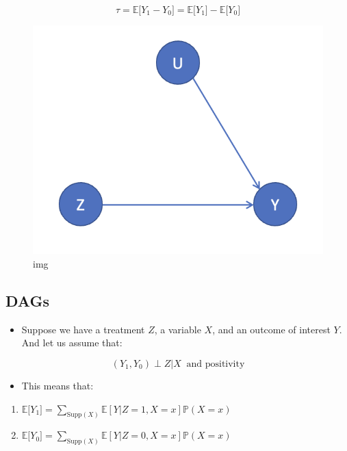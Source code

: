 \documentclass[11pt]{article}
\providecommand{\tightlist}{%
      \setlength{\itemsep}{0pt}\setlength{\parskip}{0pt}}
\begin{document}
\[ \tau = \mathbb{E}\big[Y_{1} - Y_{0}\big] =  \mathbb{E}\big[Y_{1}\big] -  \mathbb{E}\big[Y_{0}\big] \]

\begin{figure}
\centering
\includegraphics{../img/dag4.png}
\caption{img}
\end{figure}

    \hypertarget{dags}{%
\subsection{DAGs}\label{dags}}

\begin{itemize}
\tightlist
\item
  Suppose we have a treatment \(Z\), a variable \(X\), and an outcome of
  interest \(Y\). And let us assume that:
\end{itemize}

\[ (Y_{1}, Y_{0}) \perp Z | X \ \text{ and positivity}\]

\begin{itemize}
\tightlist
\item
  This means that:
\end{itemize}

\begin{enumerate}
\def\labelenumi{\arabic{enumi}.}
\tightlist
\item
  \(\mathbb{E}\big[Y_1\big] = \sum_{\text{Supp}(X)} \mathbb{E}[Y|Z = 1, X = x]\mathbb{P}(X = x)\)
\item
  \(\mathbb{E}\big[Y_0\big] = \sum_{\text{Supp}(X)} \mathbb{E}[Y|Z = 0, X = x]\mathbb{P}(X = x)\)
\end{enumerate}
\end{document}
